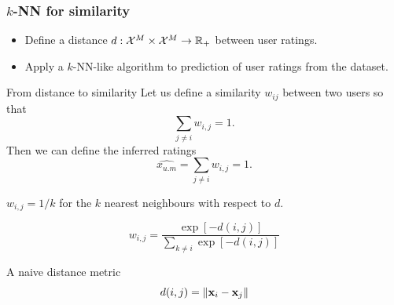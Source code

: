 \begin{frame}
  \frametitle{$k$-NN for similarity}
  \begin{exercise}
    \begin{itemize}
      \item Define a distance $d : {\mathcal{X}}^M \times {\mathcal{X}}^M \to {\mathbb{R}}_+$ between user ratings.
      \item Apply a $k$-NN-like algorithm to prediction of user ratings from the dataset.
    \end{itemize}
  \end{exercise}
\end{frame}
\begin{frame}
\begin{block}{From distance to similarity}
    Let us define a similarity $w_{ij}$ between two users so that
    \[
    \sum_{j \neq i} w_{i,j} = 1.
    \]
    Then we can define the inferred ratings 
    \[
    \hat{x_{u.m}} = \sum_{j \neq i} w_{i,j} = 1.
    \]
  \end{block}

  \begin{example}
    $w_{i,j} = 1/k$ for the $k$ nearest neighbours with respect to $d$.
  \end{example}


  \begin{example}
    \[
    w_{i,j} = \frac{\exp[-d(i,j)]}{\sum_{k \neq i} \exp[-d(i,j)]}
    \]
  \end{example}
\end{frame}

\begin{frame}
  \begin{block}{A naive distance metric}
    \[
    d(i,j) = \|{\mathbf{x}}_i - {\mathbf{x}}_j\|
    \]
  \end{block}
\end{frame}

